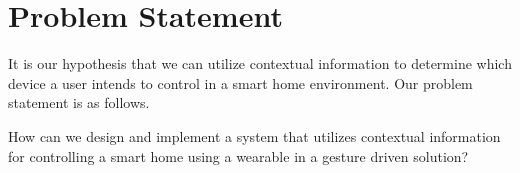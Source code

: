 \section{Problem Statement}
\label{sec:problem-statement}

It is our hypothesis that we can utilize contextual information to determine which device a user intends to control in a smart home environment. Our problem statement is as follows.

\begin{framed}
\noindent How can we design and implement a system that utilizes contextual information for controlling a smart home using a wearable in a gesture driven solution?
\end{framed}

